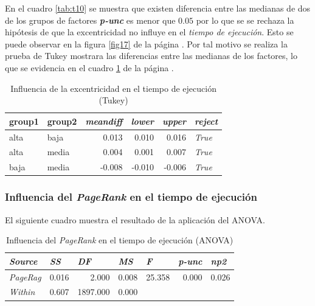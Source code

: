 \documentclass{article}
\begin{document}
En el cuadro \ref{tab:t10} se muestra que existen  diferencia entre las medianas de dos de los grupos de factores  \textbf{\emph{p-unc}} es menor que $0.05$ por lo que se se rechaza la hipótesis de que la excentricidad no influye en el \textit{tiempo de ejecución}. Esto se puede observar en la figura \ref{fig17} de la página \pageref{fig17}. Por tal motivo se realiza la prueba de Tukey mostrara las diferencias entre las medianas de los factores, lo que se evidencia en el cuadro \ref{tab:t11} de la página \pageref{tab:t11}.

\begin{table}[htbp]
  \centering
  \caption{Influencia de la excentricidad en el tiempo de ejecución (Tukey)}
    \begin{tabular}{llrrrl}
    \toprule
    \textbf{group1} & \textbf{group2} & \multicolumn{1}{l}{\textit{\textbf{meandiff}}} & \multicolumn{1}{l}{\textit{\textbf{lower}}} & \multicolumn{1}{l}{\textit{\textbf{upper}}} & \textit{\textbf{reject}} \\
    \midrule
    alta  & baja  & 0.013 & 0.010 & 0.016 & \textit{True} \\
    alta  & media & 0.004 & 0.001 & 0.007 & \textit{True} \\
    baja  & media & -0.008 & -0.010 & -0.006 & \textit{True} \\
    \bottomrule
    \end{tabular}%
  \label{tab:t11}%
\end{table}%

\subsubsection{Influencia del \textit{PageRank} en el tiempo de ejecución}

El siguiente cuadro muestra el resultado de la aplicación del ANOVA.

\begin{table}[htbp]
  \centering
  \caption{Influencia del \textit{PageRank} en el tiempo de ejecución (ANOVA)}
    \begin{tabular}{lrrrrrr}
    \toprule
    \textit{\textbf{Source}} & \multicolumn{1}{l}{\textit{\textbf{SS}}} & \multicolumn{1}{l}{\textit{\textbf{DF}}} & \multicolumn{1}{l}{\textit{\textbf{MS}}} & \multicolumn{1}{l}{\textit{\textbf{F}}} & \multicolumn{1}{l}{\textit{\textbf{p-unc}}} & \multicolumn{1}{l}{\textit{\textbf{np2}}} \\
    \midrule
    \textit{PageRag} & 0.016 & 2.000 & 0.008 & 25.358 & 0.000 & 0.026 \\
    \textit{Within} & 0.607 & 1897.000 & 0.000 &       &       &  \\
    \bottomrule
    \end{tabular}%
  \label{tab:t12}%
\end{table}%
\end{document}
